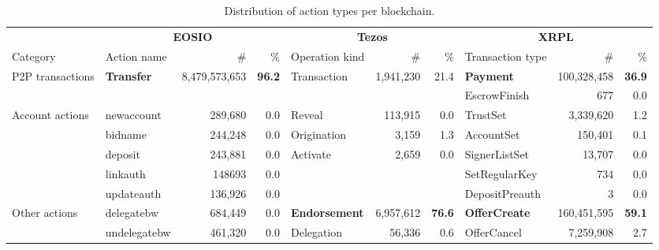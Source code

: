 \begin{table}[htbp]
  \centering
  \caption{Distribution of action types per blockchain.}
  \label{tab:transaction-types-distribution}%
    \setlength{\tabcolsep}{1.4pt}
    \scriptsize
    \begin{tabular}{@{}lp{0.7in}rrp{1.2in}rrp{0.9in}rr@{}}
        \toprule
      & \multicolumn{3}{c}{\textbf{EOSIO}} & \multicolumn{3}{c}{\textbf{Tezos}} & \multicolumn{3}{c}{\textbf{ XRPL }} \\
    Category & Action name & \# & \% & Operation kind & \# & \% & Transaction type &  \#  & \% \\
    \cmidrule(r){1-1} \cmidrule(rl){2-4} \cmidrule(rl){5-7} \cmidrule(l){8-10}
    P2P transactions & \textbf{Transfer} &    8,479,573,653  & \textbf{             96.2 } & Transaction &    1,941,230  &      21.4  & \textbf{Payment} &    100,328,458  & \textbf{     36.9} \\
      &   &   &   &   &   &   & EscrowFinish &                    677  &         0.0  \\
    \cmidrule(r){1-1} \cmidrule(rl){2-4} \cmidrule(rl){5-7} \cmidrule(l){8-10}
    Account actions & newaccount &                289,680  &                0.0  & Reveal &        113,915  &         0.0  & TrustSet &         3,339,620  &         1.2  \\
      & bidname &                244,248  &                0.0  & Origination &            3,159  &         1.3  & AccountSet &            150,401  &         0.1  \\
      & deposit &                243,881  &                0.0  & Activate &            2,659  &         0.0  & SignerListSet &              13,707  &         0.0  \\
      & linkauth & 148693 & 0.0 &   &   &   & SetRegularKey &                    734  &         0.0  \\
      & updateauth &                136,926  &                0.0  &   &   &   & DepositPreauth &                         3  &         0.0  \\
    \cmidrule(r){1-1} \cmidrule(rl){2-4} \cmidrule(rl){5-7} \cmidrule(l){8-10}
    Other actions & delegatebw &                684,449  &                0.0  & \textbf{Endorsement} &    6,957,612  & \textbf{     76.6} & \textbf{OfferCreate} &    160,451,595  & \textbf{     59.1} \\
      & undelegatebw &                461,320  &                0.0  & Delegation &          56,336  &         0.6  & OfferCancel &         7,259,908  &         2.7  \\

\end{tabular}
\end{table}
